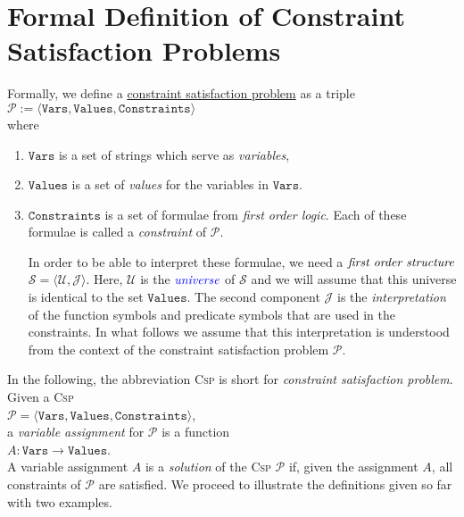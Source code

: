 \section{Formal Definition of Constraint Satisfaction Problems}
Formally, we define a 
\href{https://en.wikipedia.org/wiki/Constraint_satisfaction_problem}{constraint satisfaction problem} as a triple
\\[0.2cm]
\hspace*{1.3cm}
$\mathcal{P} := \langle \mathtt{Vars}, \mathtt{Values}, \mathtt{Constraints} \rangle$
\\[0.2cm]
where
\begin{enumerate}
\item $\mathtt{Vars}$ is a set of strings which serve as \emph{variables},
\item $\mathtt{Values}$ is a set of \emph{values} for the variables in $\mathtt{Vars}$.
\item $\mathtt{Constraints}$ is a set of formulae from \emph{\color{blue}first order logic}.  Each of these formulae is
      called a \emph{\color{blue}constraint} of $\mathcal{P}$.

      In order to be able to interpret these formulae, we need a $\emph{first order structure}$ $\mathcal{S} = \langle \mathcal{U}, \mathcal{J} \rangle$.  
      Here, $\mathcal{U}$ is the $\emph{\color{blue}universe}$ of $\mathcal{S}$ and we will assume that this
      universe is identical to the set $\mathtt{Values}$. The second component $\mathcal{J}$ is the
      \emph{\color{blue}interpretation} of the function symbols and predicate symbols that are used in the 
      constraints.  In what follows we assume that this interpretation is understood from the context of the
      constraint satisfaction problem $\mathcal{P}$.
\end{enumerate}
In the following, the abbreviation \textsc{Csp} is short for \emph{\color{blue}constraint satisfaction problem}.
Given a \textsc{Csp}
\\[0.2cm]
\hspace*{1.3cm}
 $\mathcal{P} = \langle \mathtt{Vars}, \mathtt{Values}, \mathtt{Constraints} \rangle$, 
\\[0.2cm]
a \emph{\color{blue}variable assignment} for $\mathcal{P}$ is a function
\\[0.2cm]
\hspace*{1.3cm}
$A: \mathtt{Vars} \rightarrow \mathtt{Values}$.
\\[0.2cm]
A variable assignment $A$ is a \emph{\color{blue}solution} of the \textsc{Csp} $\mathcal{P}$ 
if, given the assignment $A$, all constraints of $\mathcal{P}$ are satisfied.
We proceed to illustrate the definitions given so far with two examples.


